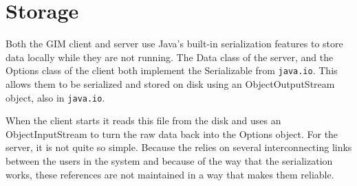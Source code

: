 \section{Storage}
Both the GIM client and server use Java's built-in serialization features to store data locally while they are not running. The Data class of the server, and the Options class of the client both implement the Serializable from \texttt{java.io}. This allows them to be serialized and stored on disk using an ObjectOutputStream object, also in \texttt{java.io}.

When the client starts it reads this file from the disk and uses an ObjectInputStream to turn the raw data back into the Options object. For the server, it is not quite so simple. Because the relies on several interconnecting links between the users in the system and because of the way that the serialization works, these references are not maintained in a way that makes them reliable. 
